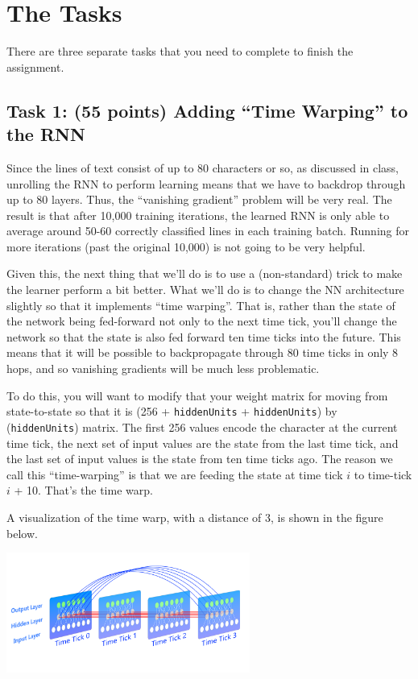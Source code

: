 \documentclass[11pt]{article}
\renewcommand\:{\colon} %
\begin{document}
\section{The Tasks}
There are three separate tasks that you need to complete to finish the assignment.


\subsection{Task 1: (55 points) Adding ``Time Warping'' to the RNN}
Since the lines of text consist of up to 80 characters or so, as discussed in class, unrolling the RNN to
perform learning means that we have to backdrop through up to 80 layers. Thus, the ``vanishing gradient''
problem will be very real. The result is that after 10,000 training iterations, the learned RNN is only able to
average around 50-60 correctly classified lines in each training batch. Running for more iterations (past the
original 10,000) is not going to be very helpful.

Given this, the next thing that we'll do is to use a (non-standard) trick to make the learner perform a bit
better. What we'll do is to change the NN architecture slightly so that it implements ``time warping''. That
is, rather than the state of the network being fed-forward not only to the next time tick, you'll change the
network so that the state is also fed forward ten time ticks into the future. This means that it will be possible
to backpropagate through 80 time ticks in only 8 hops, and so vanishing gradients will be much less problematic.

To do this, you will want to modify that your weight matrix for moving from state-to-state so that it is
(256 + \texttt{hiddenUnits} + \texttt{hiddenUnits}) by (\texttt{hiddenUnits}) matrix. The first 256 values encode the
character at the current time tick, the next set of input values are the state from the last time tick, and the last
set of input values is the state from ten time ticks ago. The reason we call this ``time-warping'' is that we are
feeding the state at time tick $i$ to time-tick $i$ + 10. That's the time warp.

A visualization of the time warp, with a distance of 3, is shown in the figure below.

\includegraphics[width=0.6\textwidth]{RNN_diagram.png}
\end{document}
